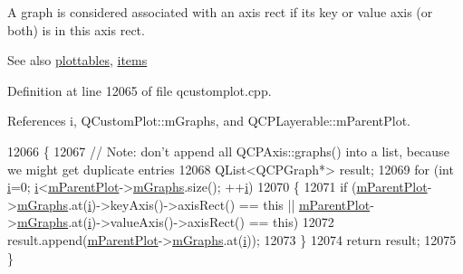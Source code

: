 A graph is considered associated with an axis rect if its key or value axis (or both) is in this axis rect.

\begin{DoxySeeAlso}{See also}
\hyperlink{class_q_c_p_axis_rect_a5b0d629c8de5572945eeae79a142296e}{plottables}, \hyperlink{class_q_c_p_axis_rect_a0f17ed539962cfcbaca8ce0b1776c840}{items} 
\end{DoxySeeAlso}


Definition at line 12065 of file qcustomplot.\+cpp.



References i, Q\+Custom\+Plot\+::m\+Graphs, and Q\+C\+P\+Layerable\+::m\+Parent\+Plot.


\begin{DoxyCode}
12066 \{
12067   \textcolor{comment}{// Note: don't append all QCPAxis::graphs() into a list, because we might get duplicate entries}
12068   QList<QCPGraph*> result;
12069   \textcolor{keywordflow}{for} (\textcolor{keywordtype}{int} \hyperlink{_comparision_pictures_2_createtest_image_8m_a6f6ccfcf58b31cb6412107d9d5281426}{i}=0; \hyperlink{_comparision_pictures_2_createtest_image_8m_a6f6ccfcf58b31cb6412107d9d5281426}{i}<\hyperlink{class_q_c_p_layerable_aa2a528433e44db02b8aef23c1f9f90ed}{mParentPlot}->\hyperlink{class_q_custom_plot_adaf8d407d72a725169d7dbed2ee386bb}{mGraphs}.size(); ++\hyperlink{_comparision_pictures_2_createtest_image_8m_a6f6ccfcf58b31cb6412107d9d5281426}{i})
12070   \{
12071     \textcolor{keywordflow}{if} (\hyperlink{class_q_c_p_layerable_aa2a528433e44db02b8aef23c1f9f90ed}{mParentPlot}->\hyperlink{class_q_custom_plot_adaf8d407d72a725169d7dbed2ee386bb}{mGraphs}.at(\hyperlink{_comparision_pictures_2_createtest_image_8m_a6f6ccfcf58b31cb6412107d9d5281426}{i})->keyAxis()->axisRect() == \textcolor{keyword}{this} || 
      \hyperlink{class_q_c_p_layerable_aa2a528433e44db02b8aef23c1f9f90ed}{mParentPlot}->\hyperlink{class_q_custom_plot_adaf8d407d72a725169d7dbed2ee386bb}{mGraphs}.at(\hyperlink{_comparision_pictures_2_createtest_image_8m_a6f6ccfcf58b31cb6412107d9d5281426}{i})->valueAxis()->axisRect() == \textcolor{keyword}{this})
12072       result.append(\hyperlink{class_q_c_p_layerable_aa2a528433e44db02b8aef23c1f9f90ed}{mParentPlot}->\hyperlink{class_q_custom_plot_adaf8d407d72a725169d7dbed2ee386bb}{mGraphs}.at(\hyperlink{_comparision_pictures_2_createtest_image_8m_a6f6ccfcf58b31cb6412107d9d5281426}{i}));
12073   \}
12074   \textcolor{keywordflow}{return} result;
12075 \}
\end{DoxyCode}
\hypertarget{class_q_c_p_axis_rect_a1c55c4f3bef40cf01b21820316c8469e}{}
